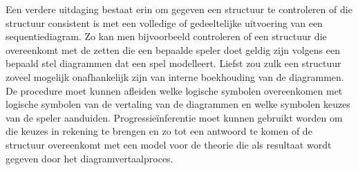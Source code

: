 Een verdere uitdaging bestaat erin om gegeven een structuur te controleren of die structuur consistent is met een volledige of gedeeltelijke uitvoering van een sequentiediagram. Zo kan men bijvoorbeeld controleren of een structuur die overeenkomt met de zetten die een bepaalde speler doet geldig zijn volgens een bepaald stel diagrammen dat een spel modelleert. Liefst zou zulk een structuur zoveel mogelijk onafhankelijk zijn van interne boekhouding van de diagrammen. De procedure moet kunnen afleiden welke logische symbolen overeenkomen met logische symbolen van de vertaling van de diagrammen en welke symbolen keuzes van de speler aanduiden. Progressie\"inferentie moet kunnen gebruikt worden om die keuzes in rekening te brengen en zo tot een antwoord te komen of de structuur overeenkomt met een model voor de theorie die als resultaat wordt gegeven door het diagramvertaalproces.